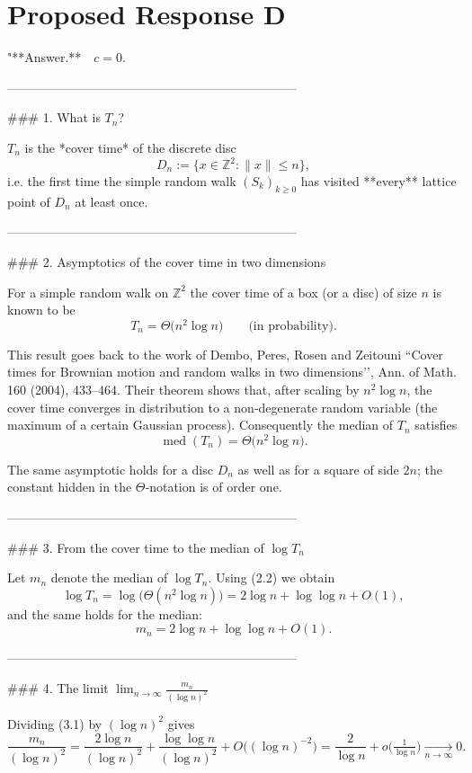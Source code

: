 \documentclass[11pt]{article}
\begin{document}
\section*{Proposed Response D}
"**Answer.** \(c=0\).

---------------------------------------------------------------------

### 1.  What is \(T_{n}\)?

\(T_{n}\) is the *cover time* of the discrete disc  
\[
D_{n}:=\{x\in\mathbb Z^{2}:\|x\|\le n\},
\]
i.e. the first time the simple random walk \((S_{k})_{k\ge0}\) has visited **every** lattice point of \(D_{n}\) at least once.

---------------------------------------------------------------------

### 2.  Asymptotics of the cover time in two dimensions

For a simple random walk on \(\mathbb Z^{2}\) the cover time of a box (or a disc) of size \(n\) is known to be
\[
T_{n}= \Theta\!\bigl(n^{2}\log n\bigr)
\qquad\text{(in probability)} .
\tag{2.1}
\]

This result goes back to the work of Dembo, Peres, Rosen and Zeitouni
“Cover times for Brownian motion and random walks in two dimensions’’,
Ann. of Math. 160 (2004), 433–464.  Their theorem shows that, after scaling by
\(n^{2}\log n\), the cover time converges in distribution to a non‑degenerate
random variable (the maximum of a certain Gaussian process).  Consequently the
median of \(T_{n}\) satisfies
\[
\operatorname{med}(T_{n}) = \Theta\!\bigl(n^{2}\log n\bigr).
\tag{2.2}
\]

The same asymptotic holds for a disc \(D_{n}\) as well as for a square of side
\(2n\); the constant hidden in the \(\Theta\)‑notation is of order one.

---------------------------------------------------------------------

### 3.  From the cover time to the median of \(\log T_{n}\)

Let \(m_{n}\) denote the median of \(\log T_{n}\).  Using (2.2) we obtain
\[
\log T_{n}
= \log\bigl(\Theta(n^{2}\log n)\bigr)
= 2\log n + \log\log n + O(1),
\]
and the same holds for the median:
\[
m_{n}=2\log n + \log\log n + O(1).
\tag{3.1}
\]

---------------------------------------------------------------------

### 4.  The limit \(\displaystyle\lim_{n\to\infty}\frac{m_{n}}{(\log n)^{2}}\)

Dividing (3.1) by \((\log n)^{2}\) gives
\[
\frac{m_{n}}{(\log n)^{2}}
= \frac{2\log n}{(\log n)^{2}}+\frac{\log\log n}{(\log n)^{2}}+O\!\bigl((\log n)^{-2}\bigr)
= \frac{2}{\log n}+o\!\bigl(\tfrac1{\log n}\bigr)\xrightarrow[n\to\infty]{}0 .
\]
\end{document}

